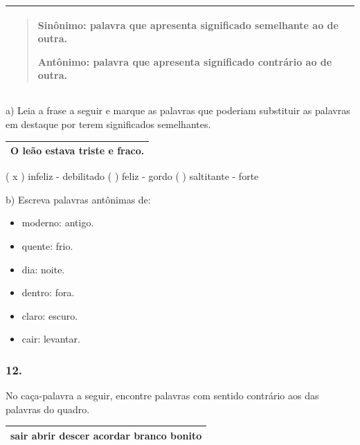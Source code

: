 
\begin{longtable}[]{@{}l@{}}
\toprule
\begin{minipage}[t]{0.97\columnwidth}\raggedright\strut
\begin{quote}
\textbf{Sinônimo}: palavra que apresenta significado semelhante ao de
outra.

\textbf{Antônimo}: palavra que apresenta significado contrário ao de
outra.
\end{quote}\strut
\end{minipage}\tabularnewline
\bottomrule
\end{longtable}

a) Leia a frase a seguir e marque as palavras que poderiam substituir as
palavras em destaque por terem significados semelhantes.

\begin{longtable}[]{@{}l@{}}
\toprule
O leão estava \textbf{triste} e \textbf{fraco}.\tabularnewline
\bottomrule
\end{longtable}

( x ) infeliz - debilitado ( ) feliz - gordo ( ) saltitante - forte

b) Escreva palavras antônimas de:

\begin{itemize}
\item
  moderno: antigo.
\item
  quente: frio.
\item
  dia: noite.
\item
  dentro: fora.
\item
  claro: escuro.
\item
  cair: levantar.
\end{itemize}

\subsubsection{12. }\label{section-11}

No caça-palavra a seguir, encontre palavras com sentido contrário aos das
palavras do quadro.

\begin{longtable}[]{@{}l@{}}
\toprule
\textbf{sair abrir descer acordar branco bonito}\tabularnewline
\bottomrule
\end{longtable}

